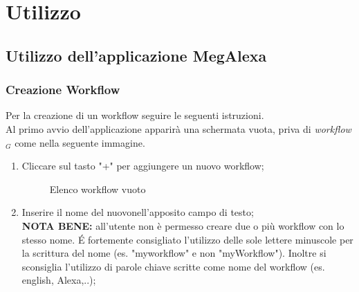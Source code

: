 \chapter{Utilizzo}
\label{Utilizzo}
\section{Utilizzo dell'applicazione MegAlexa}
\label{UtilizzoApp}
\subsection{Creazione Workflow}
Per la creazione di un workflow seguire le seguenti istruzioni.\\
Al primo avvio dell'applicazione apparirà una schermata vuota, priva di \textit{workflow$_{G}$} come nella seguente immagine.
\begin{enumerate}
\item Cliccare sul tasto "+" per aggiungere un nuovo workflow;

	\begin{figure}[H]
		\centering
		\caption{Elenco workflow vuoto}
	\end{figure}

\item Inserire il nome del nuovonell'apposito campo di testo;\\
\textbf{NOTA BENE:} all'utente non è permesso creare due o più workflow con lo stesso nome. É fortemente consigliato l'utilizzo delle sole lettere minuscole per la scrittura del nome (es. "myworkflow" e non "myWorkflow"). Inoltre si sconsiglia l'utilizzo di parole chiave scritte come nome del workflow (es. english, Alexa,..);


\end{enumerate}
